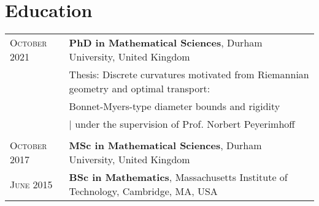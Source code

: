 \documentclass[a4paper,10pt]{article}
\begin{document}
\section{Education}
\begin{tabular}{p{2.5cm} l}

\textsc{October} 2021& \textbf{PhD in Mathematical Sciences}, {\small Durham University, United Kingdom}\\
& Thesis: {Discrete curvatures motivated from
	Riemannian geometry and optimal transport:}\\
& {Bonnet-Myers-type diameter bounds and rigidity}\\ 
&\hfill| \small under the supervision of Prof. Norbert Peyerimhoff\\&\\

\textsc{October} 2017& \textbf{MSc in Mathematical Sciences}, {\small Durham University, United Kingdom}\\

\textsc{June} 2015& \textbf{BSc in Mathematics}, {\small Massachusetts Institute of Technology, Cambridge, MA, USA}
\end{tabular}

\end{document}
